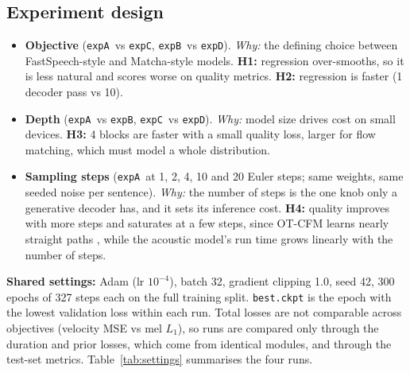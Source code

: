 \documentclass[11pt,a4paper]{article}
\newcommand{\expA}{\texttt{expA}}
\newcommand{\expB}{\texttt{expB}}
\newcommand{\expC}{\texttt{expC}}
\newcommand{\expD}{\texttt{expD}}
\begin{document}
\subsection{Experiment design}
\begin{itemize}
  \item \textbf{Objective} (\expA\ vs \expC, \expB\ vs \expD). \emph{Why:} the defining choice between FastSpeech-style and Matcha-style models. \textbf{H1:} regression over-smooths, so it is less natural and scores worse on quality metrics. \textbf{H2:} regression is faster (1 decoder pass vs 10).
  \item \textbf{Depth} (\expA\ vs \expB, \expC\ vs \expD). \emph{Why:} model size drives cost on small devices. \textbf{H3:} 4 blocks are faster with a small quality loss, larger for flow matching, which must model a whole distribution.
  \item \textbf{Sampling steps} (\expA\ at 1, 2, 4, 10 and 20 Euler steps; same weights, same seeded noise per sentence). \emph{Why:} the number of steps is the one knob only a generative decoder has, and it sets its inference cost. \textbf{H4:} quality improves with more steps and saturates at a few steps, since OT-CFM learns nearly straight paths \citep{lipman2023flowmatching,mehta2024matcha}, while the acoustic model's run time grows linearly with the number of steps.
\end{itemize}
\textbf{Shared settings:} Adam (lr $10^{-4}$), batch 32, gradient clipping 1.0, seed 42, 300 epochs of 327 steps each on the full training split. \texttt{best.ckpt} is the epoch with the lowest validation loss within each run. Total losses are not comparable across objectives (velocity MSE vs mel $L_1$), so runs are compared only through the duration and prior losses, which come from identical modules, and through the test-set metrics. Table~\ref{tab:settings} summarises the four runs.
\end{document}
